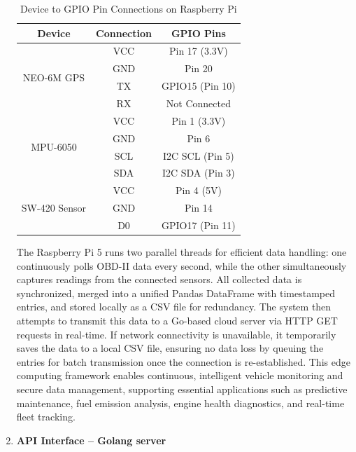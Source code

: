 \begin{enumerate}
        \begin{table}[h!]\centering
            \caption{Device to GPIO Pin Connections on Raspberry Pi}
            \label{tab:device_gpio_connections}
            \begin{tabular}{|c|c|c|}
            \hline
            \textbf{Device} & \textbf{Connection} & \textbf{GPIO Pins} \\
            \hline
            \multirow{4}{*}{NEO-6M GPS} 
            & VCC & Pin 17 (3.3V) \\
            & GND & Pin 20 \\
            & TX  & GPIO15 (Pin 10) \\
            & RX  & Not Connected \\
            \hline
            \multirow{4}{*}{MPU-6050}
            & VCC & Pin 1 (3.3V) \\
            & GND & Pin 6 \\
            & SCL & I2C SCL (Pin 5) \\
            & SDA & I2C SDA (Pin 3) \\
            \hline
            \multirow{3}{*}{SW-420 Sensor}
            & VCC & Pin 4 (5V) \\
            & GND & Pin 14 \\
            & D0  & GPIO17 (Pin 11) \\
            \hline
            \end{tabular}
        \end{table}
        The Raspberry Pi 5 runs two parallel threads for efficient data handling: one continuously polls OBD-II data every second, while the other simultaneously captures readings from the connected sensors. All collected data is synchronized, merged into a unified Pandas DataFrame with timestamped entries, and stored locally as a CSV file for redundancy. The system then attempts to transmit this data to a Go-based cloud server via HTTP GET requests in real-time. If network connectivity is unavailable, it temporarily saves the data to a local CSV file, ensuring no data loss by queuing the entries for batch transmission once the connection is re-established. This edge computing framework enables continuous, intelligent vehicle monitoring and secure data management, supporting essential applications such as predictive maintenance, fuel emission analysis, engine health diagnostics, and real-time fleet tracking.
    \item \textbf{API Interface – Golang server}

\end{enumerate}
